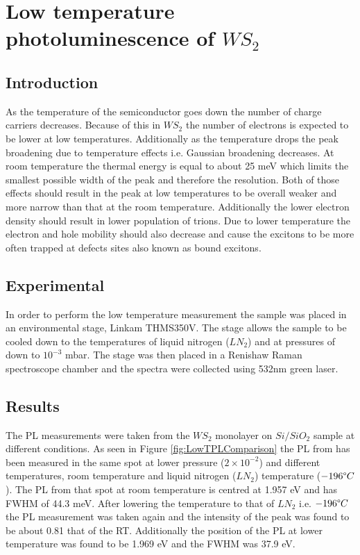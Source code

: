 \chapter{Low temperature photoluminescence of $WS_2$}

\section{Introduction}

As the temperature of the semiconductor goes down the number of charge carriers decreases. Because of this in $WS_2$ the number of electrons is expected to be lower at low temperatures. Additionally as the temperature drops the peak broadening due to temperature effects i.e. Gaussian broadening decreases. At room temperature the thermal energy is equal to about 25 meV which limits the smallest possible width of the peak and therefore the resolution. Both of those effects should result in the peak at low temperatures to be overall weaker and more narrow than that at the room temperature. Additionally the lower electron density should result in lower population of trions. Due to lower temperature the electron and hole mobility should also decrease and cause the excitons to be more often trapped at defects sites also known as bound excitons.

\section{Experimental}

In order to perform the low temperature measurement the sample was placed in an environmental stage, Linkam THMS350V. The stage allows the sample to be cooled down to the temperatures of liquid nitrogen ($LN_2$) and at pressures of down to $10^{-3}$ mbar. The stage was then placed in a Renishaw Raman spectroscope chamber and the spectra were collected using 532nm green laser.

\section{Results}

The PL measurements were taken from the $WS_2$ monolayer on $Si/SiO_2$ sample at different conditions. As seen in Figure \ref{fig:LowTPLComparison} the PL from has been measured in the same spot at lower pressure ($2 \times 10^{-2}$) and different temperatures, room temperature and liquid nitrogen ($LN_2$) temperature ($-196 \degree C$). The PL from that spot at room temperature is centred at 1.957 eV and has FWHM of 44.3 meV. After lowering the temperature to that of $LN_2$ i.e. $-196 \degree C$ the PL measurement was taken again and the intensity of the peak was found to be about 0.81 that of the RT. Additionally the position of the PL at lower temperature was found to be 1.969 eV and the FWHM was 37.9 eV.

